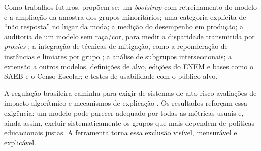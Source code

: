 Como trabalhos futuros, propõem-se: um \textit{bootstrap} com retreinamento do modelo \cite{efron1993bootstrap} e a ampliação da amostra dos grupos minoritários; uma categoria explícita de ``não resposta'' no lugar da moda; a medição do desempenho em produção; a auditoria de um modelo sem raça/cor, para medir a disparidade transmitida por \textit{proxies} \cite{dwork2012fairness}; a integração de técnicas de mitigação, como a reponderação de instâncias e limiares por grupo \cite{hardt2016equality}; a análise de subgrupos interseccionais; a extensão a outros modelos, definições de alvo, edições do ENEM e bases como o SAEB e o Censo Escolar; e testes de usabilidade com o público-alvo.

A regulação brasileira caminha para exigir de sistemas de alto risco avaliações de impacto algorítmico e mecanismos de explicação \cite{brasil2018lgpd, brasil2023pl2338}. Os resultados reforçam essa exigência: um modelo pode parecer adequado por todas as métricas usuais e, ainda assim, excluir sistematicamente os grupos que mais dependem de políticas educacionais justas. A ferramenta torna essa exclusão visível, mensurável e explicável.
